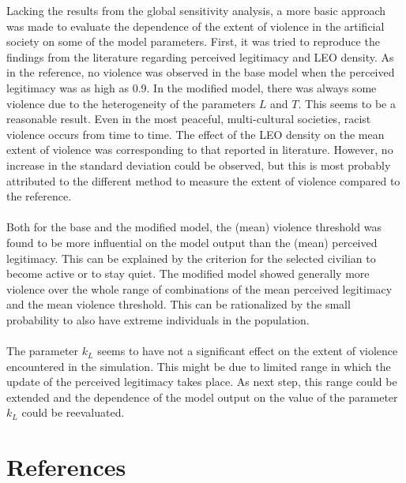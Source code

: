 \documentclass[11pt]{article}
\begin{document}
Lacking the results from the global sensitivity analysis, a more basic approach was made to evaluate the dependence of the extent of violence in the artificial society on some of the model parameters. First, it was tried to reproduce the findings from the literature regarding perceived legitimacy and LEO density. As in the reference, no violence was observed in the base model when the perceived legitimacy was as high as 0.9. In the modified model, there was always some violence due to the heterogeneity of the parameters $L$ and $T$. This seems to be a reasonable result. Even in the most peaceful, multi-cultural societies, racist violence occurs from time to time. The effect of the LEO density on the mean extent of violence was corresponding to that reported in literature. However, no increase in the standard deviation could be observed, but this is most probably attributed to the different method to measure the extent of violence compared to the reference.\\
\\
Both for the base and the modified model, the (mean) violence threshold was found to be more influential on the model output than the (mean) perceived legitimacy. This can be explained by the criterion for the selected civilian to become active or to stay quiet. The modified model showed generally more violence over the whole range of combinations of the mean perceived legitimacy and the mean violence threshold. This can be rationalized by the small probability to also have extreme individuals in the population.\\
\\
The parameter $k_L$ seems to have not a significant effect on the extent of violence encountered in the simulation. This might be due to limited range in which the update of the perceived legitimacy takes place. As next step, this range could be extended and the dependence of the model output on the value of the parameter $k_L$ could be reevaluated.

\section{References}
\end{document}
